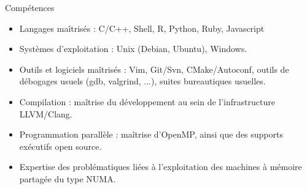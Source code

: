 \documentclass{cv}
\begin{document}
\begin{rubrique}{Compétences}%

  \begin{itemize}
    \item Langages maîtrisés : C/C++, Shell, R, Python, Ruby, Javascript

    \item Systèmes d'exploitation : Unix (Debian, Ubuntu), Windows.

    \item Outils et logiciels maîtrisés : Vim, Git/Svn, CMake/Autoconf, outils de débogages usuels (gdb, valgrind, ...), suites bureautiques usuelles.

    \item Compilation : maîtrise du développement au sein de l'infrastructure LLVM/Clang.

    \item Programmation parallèle : maîtrise d'OpenMP, ainsi que des supports exécutifs open source.


    \item Expertise des problématiques liées à l'exploitation des machines à mémoire partagée du type NUMA.
  \end{itemize}

\end{rubrique}
\end{document}
